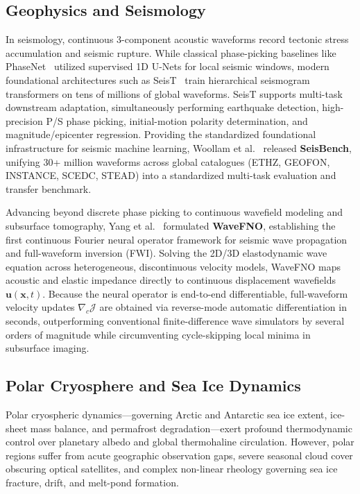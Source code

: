 \subsection{Geophysics and Seismology}
In seismology, continuous 3-component acoustic waveforms record tectonic stress accumulation and seismic rupture. While classical phase-picking baselines like PhaseNet~\cite{zhu2019phasenet} utilized supervised 1D U-Nets for local seismic windows, modern foundational architectures such as SeisT~\cite{li2024seist} train hierarchical seismogram transformers on tens of millions of global waveforms. SeisT supports multi-task downstream adaptation, simultaneously performing earthquake detection, high-precision P/S phase picking, initial-motion polarity determination, and magnitude/epicenter regression. Providing the standardized foundational infrastructure for seismic machine learning, Woollam et al.~\cite{woollam2022seisbench} released \textbf{SeisBench}, unifying 30+ million waveforms across global catalogues (ETHZ, GEOFON, INSTANCE, SCEDC, STEAD) into a standardized multi-task evaluation and transfer benchmark.

Advancing beyond discrete phase picking to continuous wavefield modeling and subsurface tomography, Yang et al.~\cite{yang2021seismic} formulated \textbf{WaveFNO}, establishing the first continuous Fourier neural operator framework for seismic wave propagation and full-waveform inversion (FWI). Solving the 2D/3D elastodynamic wave equation across heterogeneous, discontinuous velocity models, WaveFNO maps acoustic and elastic impedance directly to continuous displacement wavefields $\mathbf{u}(\mathbf{x}, t)$. Because the neural operator is end-to-end differentiable, full-waveform velocity updates $\nabla_c \mathcal{J}$ are obtained via reverse-mode automatic differentiation in seconds, outperforming conventional finite-difference wave simulators by several orders of magnitude while circumventing cycle-skipping local minima in subsurface imaging.

\subsection{Polar Cryosphere and Sea Ice Dynamics}
\label{sec:polar_cryosphere}
Polar cryospheric dynamics---governing Arctic and Antarctic sea ice extent, ice-sheet mass balance, and permafrost degradation---exert profound thermodynamic control over planetary albedo and global thermohaline circulation. However, polar regions suffer from acute geographic observation gaps, severe seasonal cloud cover obscuring optical satellites, and complex non-linear rheology governing sea ice fracture, drift, and melt-pond formation.

